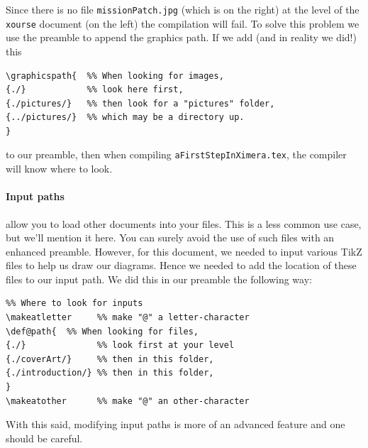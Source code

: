 \documentclass{ximera}
\begin{document}
Since there is no file \verb!missionPatch.jpg! (which is on the right) at the
level of the
\verb!xourse! document (on the left) the compilation will fail. To solve this
problem we use the preamble to append the graphics path. If we add (and in
reality we did!) this
\begin{verbatim}
\graphicspath{  %% When looking for images,
{./}            %% look here first,
{./pictures/}   %% then look for a "pictures" folder,
{../pictures/}  %% which may be a directory up.
}
\end{verbatim}
to our preamble, then when compiling \verb!aFirstStepInXimera.tex!, the
compiler will know where to look.

\paragraph{Input paths} allow you to load other documents into your files. 
This is a less common use case, but we'll mention it here. You can surely avoid the use of such files with an enhanced preamble. However, for this document, we
needed to input various TikZ files to help us draw our diagrams. Hence we needed to
add the location of these files to our input path. We did this in our preamble
the following way:
\begin{verbatim}
%% Where to look for inputs
\makeatletter     %% make "@" a letter-character
\def@path{  %% When looking for files,
{./}              %% look first at your level
{./coverArt/}     %% then in this folder,
{./introduction/} %% then in this folder,
}
\makeatother      %% make "@" an other-character
\end{verbatim}
With this said, modifying input paths is more of an advanced feature and one should be careful.
\end{document}
